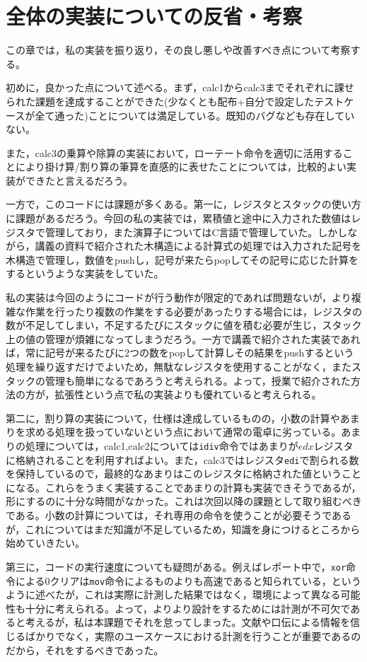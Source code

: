 \documentclass[a4paper]{jsarticle}
\newcommand{\var}[1]{\texttt{#1}}
\begin{document}
\section{全体の実装についての反省・考察}
この章では，私の実装を振り返り，その良し悪しや改善すべき点について考察する。

初めに，良かった点について述べる。まず，calc1からcalc3までそれぞれに課せられた課題を達成することができた(少なくとも配布+自分で設定したテストケースが全て通った)ことについては満足している。既知のバグなども存在していない。

また，calc3の乗算や除算の実装において，ローテート命令を適切に活用することにより掛け算/割り算の筆算を直感的に表せたことについては，比較的よい実装ができたと言えるだろう。

一方で，このコードには課題が多くある。第一に，レジスタとスタックの使い方に課題があるだろう。今回の私の実装では，累積値と途中に入力された数値はレジスタで管理しており，また演算子についてはC言語で管理していた。しかしながら，講義の資料で紹介された木構造による計算式の処理では入力された記号を木構造で管理し，数値をpushし，記号が来たらpopしてその記号に応じた計算をするというような実装をしていた。

私の実装は今回のようにコードが行う動作が限定的であれば問題ないが，より複雑な作業を行ったり複数の作業をする必要があったりする場合には，レジスタの数が不足してしまい，不足するたびにスタックに値を積む必要が生じ，スタック上の値の管理が煩雑になってしまうだろう。一方で講義で紹介された実装であれば，常に記号が来るたびに2つの数をpopして計算しその結果をpushするという処理を繰り返すだけでよいため，無駄なレジスタを使用することがなく，またスタックの管理も簡単になるであろうと考えられる。よって，授業で紹介された方法の方が，拡張性という点で私の実装よりも優れていると考えられる。

第二に，割り算の実装について，仕様は達成しているものの，小数の計算やあまりを求める処理を扱っていないという点において通常の電卓に劣っている。あまりの処理については，calc1,calc2については\var{idiv}命令ではあまりが$edx$レジスタに格納されることを利用すればよい。また，calc3ではレジスタ\var{edi}で割られる数を保持しているので，最終的なあまりはこのレジスタに格納された値ということになる。これらをうまく実装することであまりの計算も実装できそうであるが，形にするのに十分な時間がなかった。これは次回以降の課題として取り組むべきである。小数の計算については，それ専用の命令を使うことが必要そうであるが，これについてはまだ知識が不足しているため，知識を身につけるところから始めていきたい。

第三に，コードの実行速度についても疑問がある。例えばレポート中で，\var{xor}命令による0クリアは\var{mov}命令によるものよりも高速であると知られている，というように述べたが，これは実際に計測した結果ではなく，環境によって異なる可能性も十分に考えられる。よって，よりより設計をするためには計測が不可欠であると考えるが，私は本課題でそれを怠ってしまった。文献や口伝による情報を信じるばかりでなく，実際のユースケースにおける計測を行うことが重要であるのだから，それをするべきであった。
\end{document}
